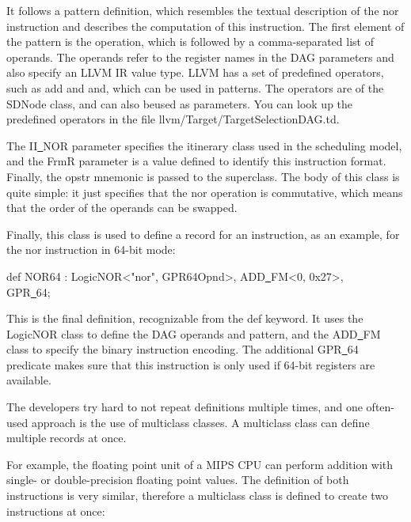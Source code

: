 It follows a pattern definition, which resembles the textual description of the nor instruction and describes the computation of this instruction. The first element of the pattern is the operation, which is followed by a comma-separated list of operands. The operands refer to the register names in the DAG parameters and also specify an LLVM IR value type. LLVM has a set of predefined operators, such as add and and, which can be used in patterns. The operators are of the SDNode class, and can also beused as parameters. You can look up the predefined operators in the file llvm/Target/TargetSelectionDAG.td.\par

The II\underline{~}NOR parameter specifies the itinerary class used in the scheduling model, and the FrmR parameter is a value defined to identify this instruction format. Finally, the opstr mnemonic is passed to the superclass. The body of this class is quite simple: it just specifies that the nor operation is commutative, which means that the order of the operands can be swapped.\par

Finally, this class is used to define a record for an instruction, as an example, for the nor instruction in 64-bit mode:\par

\begin{tcolorbox}[colback=white,colframe=black]
def NOR64 : LogicNOR<"nor", GPR64Opnd>, ADD\underline{~}FM<0, 0x27>,  \\
\hspace*{6cm}GPR\underline{~}64;
\end{tcolorbox}

This is the final definition, recognizable from the def keyword. It uses the LogicNOR class to define the DAG operands and pattern, and the ADD\underline{~}FM class to specify the binary instruction encoding. The additional GPR\underline{~}64 predicate makes sure that this instruction is only used if 64-bit registers are available.\par

The developers try hard to not repeat definitions multiple times, and one often-used approach is the use of multiclass classes. A multiclass class can define multiple records at once.\par

For example, the floating point unit of a MIPS CPU can perform addition with single- or double-precision floating point values. The definition of both instructions is very similar, therefore a multiclass class is defined to create two instructions at once:\par

